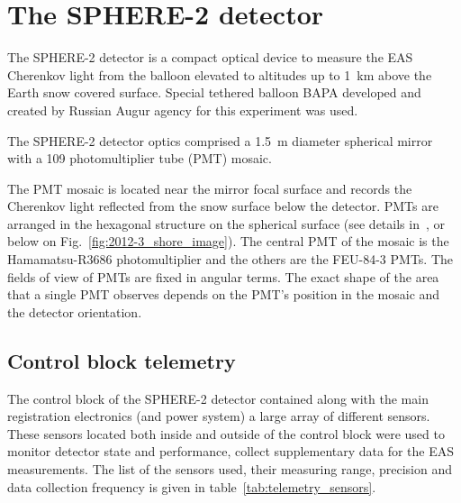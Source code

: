 \documentclass[final,5p,times,twocolumn]{elsarticle}
\begin{document}
\section{The SPHERE-2 detector \label{sect:detector}}

The \mbox{SPHERE-2} detector is a compact optical device to measure the EAS Cherenkov light from the balloon elevated to altitudes up to 1~km above the Earth snow covered surface. Special tethered balloon BAPA developed and created by Russian Augur agency for this experiment was used.

The \mbox{SPHERE-2} detector optics comprised a 1.5~m diameter spherical mirror with a 109 photomultiplier tube (PMT) mosaic. 

The PMT mosaic is located near the mirror focal surface and records the Cherenkov light reflected from the snow surface below the detector. PMTs are arranged in the hexagonal structure on the spherical surface (see details in~\cite{Ant20}, or below on Fig.~\ref{fig:2012-3_shore_image}). The central PMT of the mosaic is the Hamamatsu-R3686 photomultiplier and the others are the FEU-84-3 PMTs. The fields of view of PMTs are fixed in angular terms. The exact shape of the area that a single PMT observes depends on the PMT's position in the mosaic and the detector orientation.


\subsection{Control block telemetry}

The control block of the SPHERE-2 detector contained along with the main registration electronics (and power system) a large array of different sensors. These sensors located both inside and outside of the control block were used to monitor detector state and performance, collect supplementary data for the EAS measurements. The list of the sensors used, their measuring range, precision and data collection frequency is given in table~\ref{tab:telemetry_sensors}. 
\end{document}

